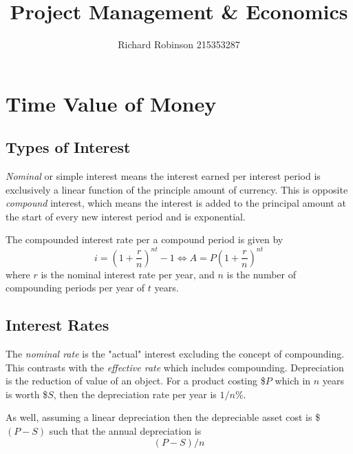 \documentclass[oneside, 12pt]{book}
\title{\Huge{\textbf{Project Management \& Economics}}}
\author{Richard Robinson 215353287}
\begin{document}
\maketitle
\tableofcontents
\setlength{\parindent}{0pt}

\chapter{Time Value of Money}

\section{Types of Interest}

\emph{Nominal} or simple interest means the interest earned per interest period is exclusively a linear function of the principle amount of currency. This is opposite \emph{compound} interest, which means the interest is added to the principal amount at the start of every new interest period and is exponential.

\bigskip
The compounded interest rate per a compound period is given by \begin{equation}
    i = \left(1 + \frac{r}{n} \right)^{nt} - 1 \iff A = P \left(1 + \frac{r}{n} \right)^{nt}
\end{equation}
where $r$ is the nominal interest rate per year, and $n$ is the number of compounding periods per year of $t$ years.

\section{Interest Rates}
The \emph{nominal rate} is the "actual" interest excluding the concept of compounding. This contrasts with the \emph{effective rate} which includes compounding. Depreciation is the reduction of value of an object. For a product costing \$$P$ which in $n$ years is worth \$$S$, then the depreciation rate per year is $1/n$\%.

\bigskip
As well, assuming a linear depreciation then the depreciable asset cost is \$$(P-S)$ such that the annual depreciation is \begin{equation}
    (P-S)/n
\end{equation}
\end{document}
